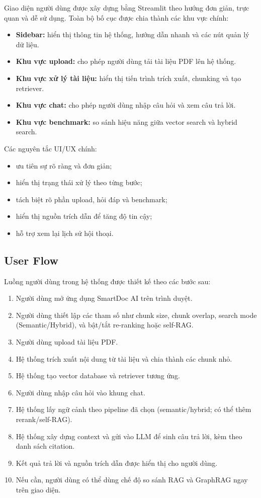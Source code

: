 \documentclass[conference]{IEEEtran}
\begin{document}
Giao diện người dùng được xây dựng bằng Streamlit theo hướng đơn giản, trực quan và dễ sử dụng. Toàn bộ bố cục được chia thành các khu vực chính:
\begin{itemize}
  \item \textbf{Sidebar:} hiển thị thông tin hệ thống, hướng dẫn nhanh và các nút quản lý dữ liệu.
  \item \textbf{Khu vực upload:} cho phép người dùng tải tài liệu PDF lên hệ thống.
  \item \textbf{Khu vực xử lý tài liệu:} hiển thị tiến trình trích xuất, chunking và tạo retriever.
  \item \textbf{Khu vực chat:} cho phép người dùng nhập câu hỏi và xem câu trả lời.
  \item \textbf{Khu vực benchmark:} so sánh hiệu năng giữa vector search và hybrid search.
\end{itemize}

Các nguyên tắc UI/UX chính:
\begin{itemize}
  \item ưu tiên sự rõ ràng và đơn giản;
  \item hiển thị trạng thái xử lý theo từng bước;
  \item tách biệt rõ phần upload, hỏi đáp và benchmark;
  \item hiển thị nguồn trích dẫn để tăng độ tin cậy;
  \item hỗ trợ xem lại lịch sử hội thoại.
\end{itemize}

\subsection{User Flow}

Luồng người dùng trong hệ thống được thiết kế theo các bước sau:
\begin{enumerate}
  \item Người dùng mở ứng dụng SmartDoc AI trên trình duyệt.
  \item Người dùng thiết lập các tham số như chunk size, chunk overlap, search mode (Semantic/Hybrid), và bật/tắt re-ranking hoặc self-RAG.
  \item Người dùng upload tài liệu PDF.
  \item Hệ thống trích xuất nội dung từ tài liệu và chia thành các chunk nhỏ.
  \item Hệ thống tạo vector database và retriever tương ứng.
  \item Người dùng nhập câu hỏi vào khung chat.
  \item Hệ thống lấy ngữ cảnh theo pipeline đã chọn (semantic/hybrid; có thể thêm rerank/self-RAG).
  \item Hệ thống xây dựng context và gửi vào LLM để sinh câu trả lời, kèm theo danh sách citation.
  \item Kết quả trả lời và nguồn trích dẫn được hiển thị cho người dùng.
  \item Nếu cần, người dùng có thể dùng chế độ so sánh RAG và GraphRAG ngay trên giao diện.
\end{enumerate}
\end{document}
